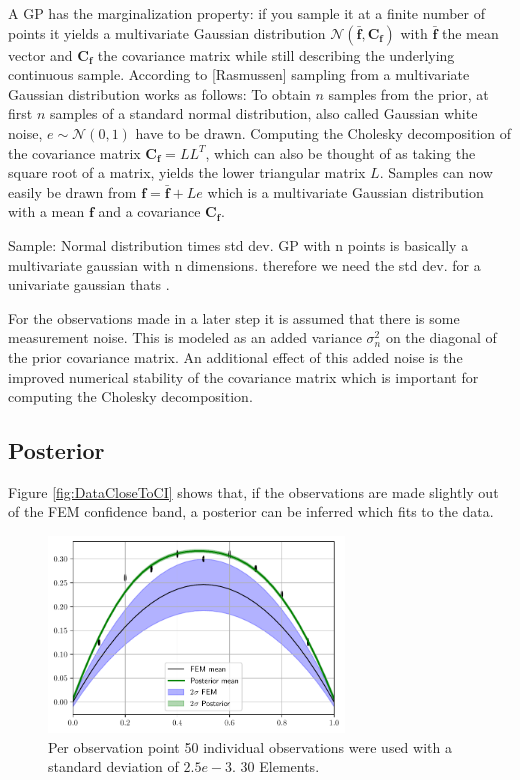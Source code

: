 \documentclass[%
  a4paper,oneside,%
  11pt,%
  smallchapters,
  green,%
  rgb, <cmyk>
  ]{tubsbook}
\begin{document}
A GP has the marginalization property: if you sample it at a finite number of points it yields a multivariate Gaussian distribution $\mathcal{N}(\bar{\bm{f}},\bm{C_f})$ with $\bar{\bm{f}}$ the mean vector and $\bm{C_f}$ the covariance matrix while still describing the underlying continuous sample.
According to [Rasmussen] sampling from a multivariate Gaussian distribution works as follows: To obtain $n$ samples from the prior, at first $n$ samples of a standard normal distribution, also called Gaussian white noise, $e \sim \mathcal{N}(0,1)$ have to be drawn. Computing the Cholesky decomposition of the covariance matrix $\bm{C_f} = LL^T$, which can also be thought of as taking the square root of a matrix, yields the lower triangular matrix $L$. Samples can now easily be drawn from $\bm{f} = \bar{\bm{f}} + Le$ which is a multivariate Gaussian distribution with a mean $\bm{f}$ and a covariance $\bm{C_f}$.

Sample: Normal distribution times std dev. GP with n points is basically a multivariate gaussian with n dimensions. therefore we need the std dev. for a univariate gaussian thats . 

For the observations made in a later step it is assumed that there is some measurement noise. This is modeled as an added variance $\sigma_{n}^2$ on the diagonal of the prior covariance matrix. An additional effect of this added noise is the improved numerical stability of the covariance matrix which is important for computing the Cholesky decomposition.


\subsection{Posterior}
Figure \ref{fig:DataCloseToCI} shows that, if the observations are made slightly out of the FEM confidence band, a posterior can be inferred which fits to the data.
\begin{figure}[h]
\includegraphics[width=0.7\textwidth]{pics/DataCloseToCI.pdf}
\centering
\caption{Per observation point 50 individual observations were used with a standard deviation of $2.5e-3$. 30 Elements.}
\end{figure}
\label{fig:DataCloseToCI}
\end{document}
